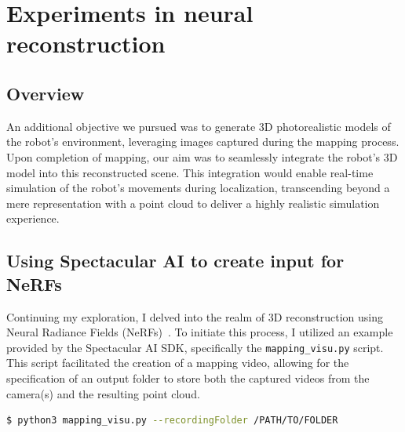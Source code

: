 \chapter{Experiments in neural reconstruction} \label{nerf_gsplat}

\section{Overview}


An additional objective we pursued was to generate 3D photorealistic models of the robot's environment, leveraging images captured during the mapping process. Upon completion of mapping, our aim was to seamlessly integrate the robot's 3D model into this reconstructed scene. This integration would enable real-time simulation of the robot's movements during localization, transcending beyond a mere representation with a point cloud to deliver a highly realistic simulation experience.


\section{Using Spectacular AI to create input for NeRFs}

Continuing my exploration, I delved into the realm of 3D reconstruction using Neural Radiance Fields (NeRFs)~\cite{nerf}. To initiate this process, I utilized an example provided by the Spectacular AI SDK, specifically the \verb|mapping_visu.py| script. This script facilitated the creation of a mapping video, allowing for the specification of an output folder to store both the captured videos from the camera(s) and the resulting point cloud.

\begin{lstlisting}[language=bash,frame=single,float=!ht]
$ python3 mapping_visu.py --recordingFolder /PATH/TO/FOLDER
\end{lstlisting}

